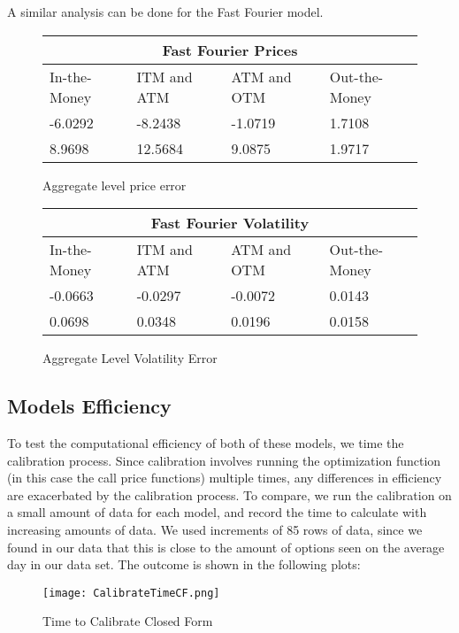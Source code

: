 \documentclass[fontsize=12pt]{article}
\numberwithin{equation}{section} %
\numberwithin{figure}{section} %
\numberwithin{table}{section} %
\begin{document}
A similar analysis can be done for the Fast Fourier model.


\begin{figure}[H]
\centering
\begin{tabular}{| p{2.5cm} | p{2.5cm} | p{2.5cm} | p{2.5cm}|}
\hline
\multicolumn{4}{|c|}{Fast Fourier Prices} \\
\hline
 In-the-Money & ITM and ATM & ATM and OTM & Out-the-Money \\ \hline
-6.0292 & -8.2438 & -1.0719 & 1.7108 \\ \hline
8.9698 & 12.5684  & 9.0875 & 1.9717 \\ \hline
\end{tabular}
\caption{Aggregate level price error}
\label{tabla:Aggregate price error FFT}
\end{figure}

\begin{figure}[H]
\centering
\begin{tabular}{| p{2.5cm} | p{2.5cm} | p{2.5cm} | p{2.5cm}|}
\hline
\multicolumn{4}{|c|}{Fast Fourier Volatility} \\
\hline
 In-the-Money & ITM and ATM & ATM and OTM & Out-the-Money \\ \hline
-0.0663 & -0.0297 & -0.0072 &  0.0143 \\ \hline
0.0698 & 0.0348 & 0.0196 & 0.0158 \\ \hline
\end{tabular}
\caption{Aggregate Level Volatility Error}
\label{tabla:Aggregated Vol Error FFT}
\end{figure}


\subsection{Models Efficiency} \label{Models Efficiency}

To test the computational efficiency of both of these models, we time the calibration process. Since calibration involves running the optimization function (in this case the call price functions) multiple times, any differences in efficiency are exacerbated by the calibration process. To compare, we run the calibration on a small amount of data for each model, and record the time to calculate with increasing amounts of data. We used increments of 85 rows of data, since we found in our data that this is close to the amount of options seen on the average day in our data set. 
The outcome is shown in the following plots:

\begin{figure}[H]
  \centering
   \texttt{[image: CalibrateTimeCF.png]}
  \caption{Time to Calibrate Closed Form}
  \label{fig:CF Time}
\end{figure}
\end{document}
